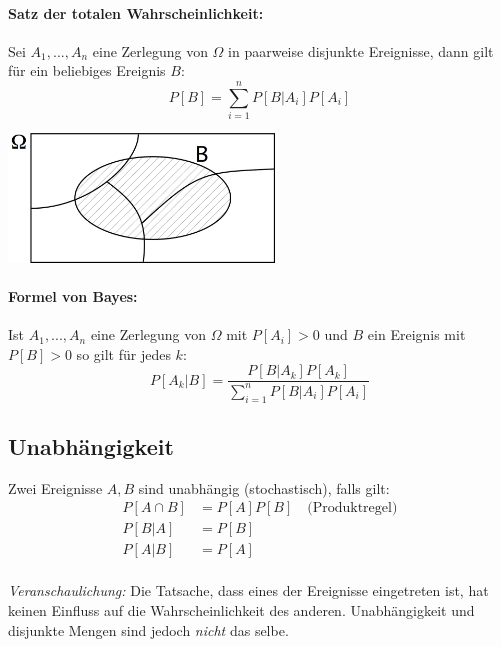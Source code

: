 \documentclass[11pt]{article}
\begin{document}
\paragraph{Satz der totalen Wahrscheinlichkeit:} Sei $A_1,...,A_n$ eine Zerlegung von $\Omega$ in paarweise disjunkte Ereignisse, dann gilt f{\"u}r ein beliebiges Ereignis $B$:
\begin{equation*}
	P[B] = \sum_{i=1}^n P[B|A_i] P[A_i]
\end{equation*}
\begin{center}
	\includegraphics[width=200pt]{images/totale_wahrscheinlichkeit}
\end{center}

\paragraph{Formel von Bayes:} Ist $A_1,...,A_n$ eine Zerlegung von $\Omega$ mit $P[A_i] > 0$ und $B$ ein Ereignis mit $P[B] > 0$ so gilt f{\"u}r jedes $k$:
\begin{equation*}
	P[A_k|B] = \frac{P[B|A_k]P[A_k]}{\sum_{i=1}^n P[B|A_i]P[A_i]}
\end{equation*}

\subsection{Unabh{\"a}ngigkeit}

Zwei Ereignisse $A, B$ sind unabh{\"a}ngig (stochastisch), falls gilt:
\begin{equation*}
\begin{split}
	P[A \cap B] & = P[A]P[B] \quad\text{(Produktregel)}\\
	P[B|A] & = P[B] \\
	P[A|B] & = P[A] \\
\end{split}
\end{equation*}

\emph{Veranschaulichung:} Die Tatsache, dass eines der Ereignisse eingetreten ist, hat keinen Einfluss auf die Wahrscheinlichkeit des anderen. Unabh{\"a}ngigkeit und disjunkte Mengen sind jedoch \emph{nicht} das selbe.
\end{document}
